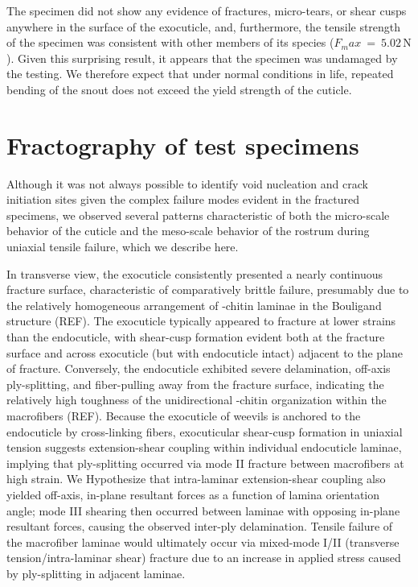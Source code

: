 \documentclass[twocolumn, linenumbers, superscriptaddress, nofootinbib]{revtex4-1}
\begin{document}
		The specimen did not show any evidence of fractures, micro-tears, or shear cusps anywhere in the surface of the exocuticle, and, furthermore, the tensile strength of the specimen was consistent with other members of its species ($F_max~=~5.02\,\text{N}$).
		Given this surprising result, it appears that the specimen was undamaged by the testing.
		We therefore expect that under normal conditions in life, repeated bending of the snout does not exceed the yield strength of the cuticle.
			
	\section{Fractography of test specimens}
		Although it was not always possible to identify void nucleation and crack initiation sites given the complex failure modes evident in the fractured specimens, we observed several patterns characteristic of both the micro-scale behavior of the cuticle and the meso-scale behavior of the rostrum during uniaxial tensile failure, which we describe here.
		
		In transverse view, the exocuticle consistently presented a nearly continuous fracture surface, characteristic of comparatively brittle failure, presumably due to the relatively homogeneous arrangement of \textalpha-chitin laminae in the Bouligand structure (REF).
		The exocuticle typically appeared to fracture at lower strains than the endocuticle, with shear-cusp formation evident both at the fracture surface and across exocuticle (but with endocuticle intact) adjacent to the plane of fracture.
		Conversely, the endocuticle exhibited severe delamination, off-axis ply-splitting, and fiber-pulling away from the fracture surface, indicating the relatively high toughness of the unidirectional \textalpha-chitin organization within the macrofibers (REF).
		Because the exocuticle of weevils is anchored to the endocuticle by cross-linking fibers, exocuticular shear-cusp formation in uniaxial tension suggests extension-shear coupling within individual endocuticle laminae, implying that ply-splitting occurred via mode II fracture between macrofibers at high strain.
		We Hypothesize that intra-laminar extension-shear coupling also yielded off-axis, in-plane resultant forces as a function of lamina orientation angle; mode III shearing then occurred between laminae with opposing in-plane resultant forces, causing the observed inter-ply delamination.
		Tensile failure of the macrofiber laminae would ultimately occur via mixed-mode I/II (transverse tension/intra-laminar shear) fracture due to an increase in applied stress caused by ply-splitting in adjacent laminae.
		
\end{document}
